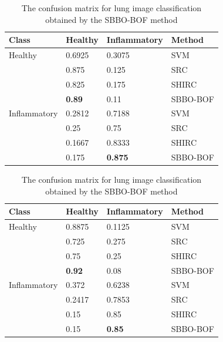 \begin{table}
\renewcommand{\arraystretch}{1.2}
\scriptsize
\begin{minipage}[b]{0.5\textwidth}
    \caption[The confusion matrix for kidney image classification obtained by the SBBO-BOF method]{\fontsize{10pt}{12pt}\selectfont The confusion matrix for kidney image classification obtained by the SBBO-BOF method}
    \label{tab:cm_kid}
\renewcommand{\arraystretch}{1.2}
\begin{tabular}{|p{0.7in}|p{0.45in}|p{0.6in}|p{0.7in}|}
\hline
Class    &    Healthy    &    Inflammatory    &    Method    \\
\hline
Healthy    &    0.6925    &    0.3075    &    SVM    \\
    &    0.875    &    0.125    &    SRC    \\
    &    0.825    &    0.175    &    SHIRC    \\
    &    \textbf{0.89}    &    0.11    &    SBBO-BOF    \\
\hline
Inflammatory    &    0.2812    &    0.7188    &    SVM    \\
    &    0.25    &    0.75    &    SRC    \\
    &    0.1667    &    0.8333    &    SHIRC    \\
    &    0.175    &    \textbf{0.875}    &    SBBO-BOF    \\
\hline
 \end{tabular}
  \end{minipage}\qquad
 \begin{minipage}[b]{0.50\textwidth}
 \scriptsize
    \caption[ The confusion matrix for lung image classification obtained by the SBBO-BOF method]{\fontsize{10pt}{12pt}\selectfont The confusion matrix for lung image classification obtained by the SBBO-BOF method}
    \label{tab:cm_lg}
{\renewcommand{\arraystretch}{1.2}    
\begin{tabular}{|p{0.7in}|p{0.45in}|p{0.6in}|p{0.7in}|}
    \hline
Class    &    Healthy    &    Inflammatory    &    Method    \\
\hline
Healthy    &    0.8875    &    0.1125    &    SVM    \\
    &    0.725    &    0.275    &    SRC    \\
    &    0.75    &    0.25    &    SHIRC    \\
    &\textbf{    0.92    }&    0.08    &    SBBO-BOF    \\
\hline
Inflammatory    &    0.372    &    0.6238    &    SVM    \\
    &    0.2417    &    0.7853    &    SRC    \\
    &    0.15    &    0.85    &    SHIRC    \\
    &    0.15    &\textbf{    0.85    }&    SBBO-BOF    \\
\hline
 \end{tabular}}
\end{minipage} 
\end{table}


